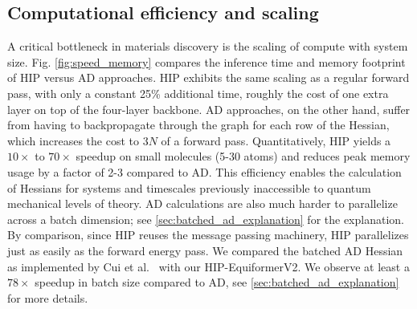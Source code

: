 \documentclass[pdflatex,sn-mathphys-num]{sn-jnl}%
\theoremstyle{thmstyleone}%
\theoremstyle{thmstyletwo}%
\theoremstyle{thmstylethree}%
\begin{document}
\subsection{Computational efficiency and scaling}


A critical bottleneck in materials discovery is the scaling of compute with system size.
Fig. \ref{fig:speed_memory} compares the inference time and memory footprint of HIP versus AD approaches.
HIP exhibits the same scaling as a regular forward pass, with only a constant 25\% additional time, roughly the cost of one extra layer on top of the four-layer backbone.
AD approaches, on the other hand, suffer from having to backpropagate through the graph for each row of the Hessian, which increases the cost to $3N$ of a forward pass.
Quantitatively, HIP yields a $10\times$ to $70\times$ speedup on small molecules (5-30 atoms) and reduces peak memory usage by a factor of 2-3 compared to AD.
This efficiency enables the calculation of Hessians for systems and timescales previously inaccessible to quantum mechanical levels of theory. 
AD calculations are also much harder to parallelize across a batch dimension; see \ref{sec:batched_ad_explanation} for the explanation. 
By comparison, since HIP reuses the message passing machinery, HIP parallelizes just as easily as the forward energy pass. We compared the batched AD Hessian as implemented by Cui et al.~\citep{cui2025horm} with our HIP-EquiformerV2. 
We observe at least a $78\times$ speedup in batch size compared to AD, see \ref{sec:batched_ad_explanation} for more details.
\end{document}
